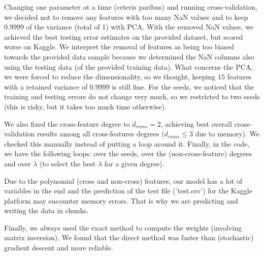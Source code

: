 \documentclass[10pt,conference,compsocconf]{IEEEtran}
\begin{document}
Changing one parameter at a time (ceteris paribus) and running cross-validation, we decided not to remove any features with too many NaN values and to keep $0.9999$ of the variance (total of 1) with PCA. With the removed NaN values, we achieved the best testing error estimates on the provided dataset, but scored worse on Kaggle. We interpret the removal of features as being too biased towards the provided data sample because we determined the NaN columns also using the testing data (of the provided training data). What concerns the PCA, we were forced to reduce the dimensionality, so we thought, keeping $15$ features with a retained variance of $0.9999$ is still fine. For the seeds, we noticed that the training and testing errors do not change very much, so we restricted to two seeds (this is risky, but it takes too much time otherwise).

We also fixed the cross-feature degree to $d_{cross} = 2$, achieving best overall cross-validation results among all cross-features degrees ($d_{cross} \leq 3$ due to memory). We checked this manually instead of putting a loop around it. Finally, in the code, we have the following loops: over the seeds, over the (non-cross-feature) degrees and over $\lambda$ (to select the best $\lambda$ for a given degree).

Due to the polynomial (cross and non-cross) features, our model has a lot of variables in the end and the prediction of the test file ('test.csv') for the Kaggle platform may encounter memory errors. That is why we are predicting and writing the data in chunks.

Finally, we always used the exact method to compute the weights (involving matrix inversion). We found that the direct method was faster than (stochastic) gradient descent and more reliable. 
\end{document}
